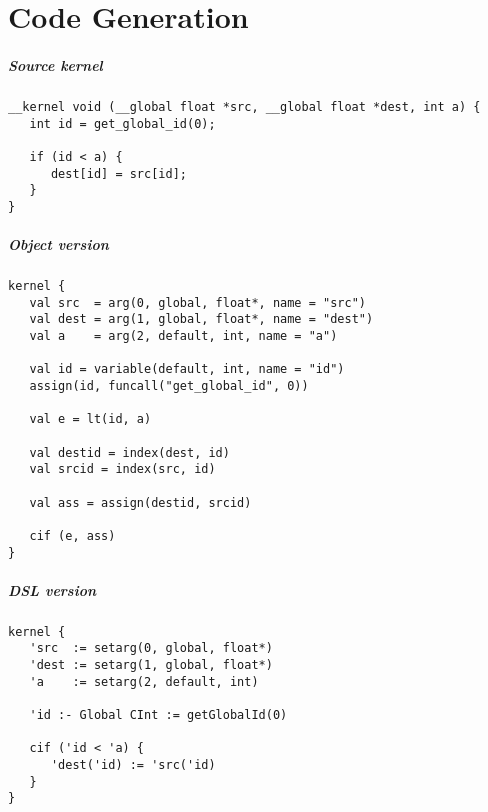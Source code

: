 \chapter{Code Generation}

\paragraph{Source kernel}

\begin{lstlisting}
__kernel void (__global float *src, __global float *dest, int a) {
   int id = get_global_id(0);

   if (id < a) {
      dest[id] = src[id];
   }
}
\end{lstlisting}

\paragraph{Object version}

\begin{lstlisting}
kernel {
   val src  = arg(0, global, float*, name = "src")
   val dest = arg(1, global, float*, name = "dest")
   val a    = arg(2, default, int, name = "a")

   val id = variable(default, int, name = "id")
   assign(id, funcall("get_global_id", 0))

   val e = lt(id, a)

   val destid = index(dest, id)
   val srcid = index(src, id)

   val ass = assign(destid, srcid)

   cif (e, ass)
}

\end{lstlisting}


\paragraph{DSL version}

\begin{lstlisting}
kernel {
   'src  := setarg(0, global, float*)
   'dest := setarg(1, global, float*)
   'a    := setarg(2, default, int)

   'id :- Global CInt := getGlobalId(0)
   
   cif ('id < 'a) {
      'dest('id) := 'src('id)
   }
}
\end{lstlisting}
